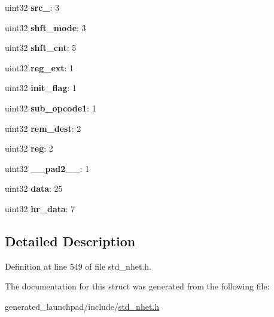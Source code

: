 \begin{DoxyCompactItemize}
\mbox{\label{structSUB__format_a9d47cb01ca41fb15b3fefaac91e0b069}} 
uint32 {\bfseries src\+\_}\+: 3
\item 
\mbox{\label{structSUB__format_ac2b76fb85fb63aa370ea3871f4c6e0c6}} 
uint32 {\bfseries shft\+\_\+mode}\+: 3
\item 
\mbox{\label{structSUB__format_a5011665cc07d860507d926fa3918f389}} 
uint32 {\bfseries shft\+\_\+cnt}\+: 5
\item 
\mbox{\label{structSUB__format_a8122175179a03292ef0625a234d8487e}} 
uint32 {\bfseries reg\+\_\+ext}\+: 1
\item 
\mbox{\label{structSUB__format_afd07173a7e17918ed4a0c4d8baa6c1e9}} 
uint32 {\bfseries init\+\_\+flag}\+: 1
\item 
\mbox{\label{structSUB__format_a220f82be748b8a86f6aabf3d71f283fe}} 
uint32 {\bfseries sub\+\_\+opcode1}\+: 1
\item 
\mbox{\label{structSUB__format_a361a2fbf84b365a769535be8e2ed662c}} 
uint32 {\bfseries rem\+\_\+dest}\+: 2
\item 
\mbox{\label{structSUB__format_a7b62e6b8d5a1a134eaf47f390ee0f44c}} 
uint32 {\bfseries reg}\+: 2
\item 
\mbox{\label{structSUB__format_a17436fb7753dccda5e04fc42020da9da}} 
uint32 {\bfseries \+\_\+\+\_\+pad2\+\_\+\+\_\+}\+: 1
\item 
\mbox{\label{structSUB__format_a3d01e45ede6351614568bee5557869ff}} 
uint32 {\bfseries data}\+: 25
\item 
\mbox{\label{structSUB__format_a48b55e74e435ecbfb09909048912dcd1}} 
uint32 {\bfseries hr\+\_\+data}\+: 7
\end{DoxyCompactItemize}


\subsection{Detailed Description}


Definition at line 549 of file std\+\_\+nhet.\+h.



The documentation for this struct was generated from the following file\+:\begin{DoxyCompactItemize}
\item 
generated\+\_\+launchpad/include/\mbox{\hyperlink{std__nhet_8h}{std\+\_\+nhet.\+h}}\end{DoxyCompactItemize}
